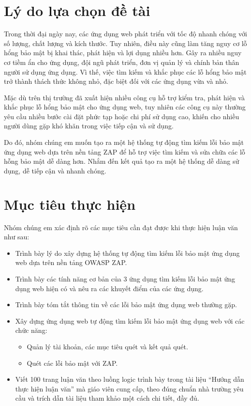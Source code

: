 \section{Lý do lựa chọn đề tài}

\tab Trong thời đại ngày nay, các ứng dụng web phát triển với tốc độ nhanh chóng với số lượng, chất lượng và kích thước.
Tuy nhiên, điều này cũng làm tăng nguy cơ lỗ hổng bảo mật bị khai thác, phát hiện và lợi dụng nhiều hơn.
Gây ra nhiều nguy cơ tiềm ẩn cho ứng dụng, đội ngũ phát triển, đơn vị quản lý và chính bản thân người sử dụng ứng dụng.
Vì thế, việc tìm kiếm và khắc phục các lỗ hổng bảo mật trở thành thách thức không nhỏ, đặc biệt đối với các ứng dụng vừa và nhỏ.
\par

Mặc dù trên thị trường đã xuất hiện nhiều công cụ hỗ trợ kiểm tra, phát hiện và khắc phục lỗ hổng bảo mật cho ứng
dụng web, tuy nhiên các công cụ này thường yêu cầu nhiều bước cài đặt phức tạp hoặc chi phí sử dụng cao, khiến cho nhiều người dùng gặp khó khăn trong việc tiếp cận và sử dụng.
\par

Do đó, nhóm chúng em muốn tạo ra một hệ thống tự động tìm kiếm lỗi bảo mật ứng dụng web dựa trên nền tảng ZAP để hỗ trợ việc tìm kiếm và sửa chữa các lỗ hỗng bảo mật dễ dàng hơn.
Nhắm đến kết quả tạo ra một hệ thống dễ dàng sử dụng, dễ tiếp cận và nhanh chóng.

\newpage
\section{Mục tiêu thực hiện}

Nhóm chúng em xác định rõ các mục tiêu cần đạt được khi thực hiện luận văn như sau:

\begin{itemize}
    \item Trình bày lý do xây dựng hệ thống tự động tìm kiếm lỗi bảo mật ứng dụng web dựa trên nền tảng OWASP ZAP.
    \item Trình bày các tính năng cơ bản của 3 ứng dụng tìm kiếm lỗi bảo mật ứng dụng web hiện có và nêu ra các khuyết điểm của các ứng dụng.
    \item Trình bày tóm tắt thông tin về các lỗi bảo mật ứng dụng web thường gặp.
    \item Xây dựng ứng dụng web tự động tìm kiếm lỗi bảo mật ứng dụng web với các chức năng:
          \begin{itemize}
              \item Quản lý tài khoản, các mục tiêu quét và kết quả quét.
              \item Quét các lỗi bảo mật với ZAP.
          \end{itemize}
    \item Viết 100 trang luận văn theo luồng logic trình bày trong tài liệu “Hướng dẫn thực hiện luận văn” mà giáo viên cung cấp, theo đúng chuẩn nhà trường yêu cầu và trích dẫn tài liệu tham khảo một cách chi tiết, đầy đủ.
\end{itemize}

